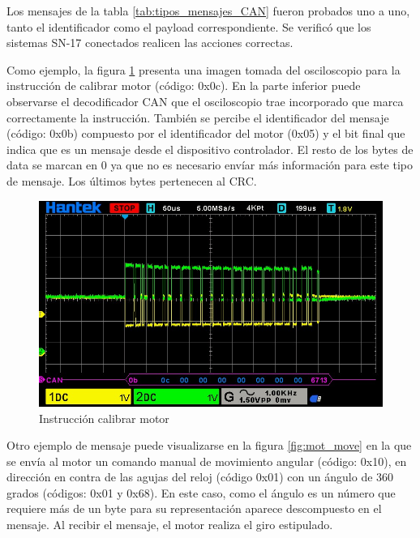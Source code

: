 Los mensajes de la tabla \ref{tab:tipos_mensajes_CAN} fueron probados uno a uno, tanto el identificador como el payload correspondiente. Se verificó que los sistemas SN-17 conectados realicen las acciones correctas.

Como ejemplo, la figura \ref{fig:mot_calib} presenta una imagen tomada del osciloscopio para la instrucción de calibrar motor (código: 0x0c). En la parte inferior puede observarse el decodificador CAN que el osciloscopio trae incorporado que marca correctamente la instrucción. También se percibe el identificador del mensaje (código: 0x0b) compuesto por el identificador del motor (0x05) y el bit final que indica que es un mensaje desde el dispositivo controlador. El resto de los bytes de data se marcan en 0 ya que no es necesario envíar más información para este tipo de mensaje. Los últimos bytes pertenecen al CRC.

\begin{figure}[htbp]
	\centering
	\includegraphics[scale=0.6]{./Figures/Motor_Calibrate.jpg}
	\caption{Instrucción calibrar motor}
	\label{fig:mot_calib}
\end{figure}

Otro ejemplo de mensaje puede visualizarse en la figura \ref{fig:mot_move} en la que se envía al motor un comando manual de movimiento angular (código: 0x10), en dirección en contra de las agujas del reloj (código 0x01) con un ángulo de 360 grados (códigos: 0x01 y 0x68). En este caso, como el ángulo es un número que requiere más de un byte para su representación aparece descompuesto en el mensaje. Al recibir el mensaje, el motor realiza el giro estipulado.

